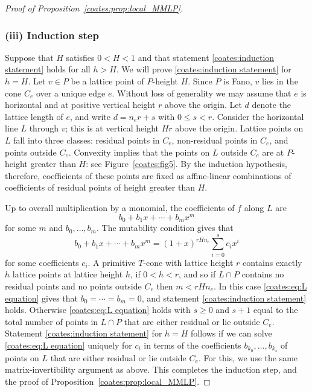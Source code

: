 \begin{proof}[Proof of Proposition~\ref{coates:prop:local_MMLP}]
  \subsubsection*{(iii) Induction step} Suppose that $H$ satisfies $0 < H < 1$ and that statement \eqref{coates:induction statement} holds for all $h > H$. We will prove \eqref{coates:induction statement} for $h=H$. Let $v \in P$ be a lattice point of $P$-height $H$. Since $P$ is Fano, $v$ lies in the cone $C_e$ over a unique edge $e$. Without loss of generality we may assume that $e$ is horizontal and at positive vertical height $r$ above the origin. Let $d$ denote the lattice length of $e$, and write $d = n_e r + s$ with $0 \leq s < r$. Consider the horizontal line $L$ through $v$; this is at vertical height $Hr$ above the origin. Lattice points on $L$ fall into three classes: residual points in $C_e$, non-residual points in $C_e$, and points outside $C_e$. Convexity implies that the points on $L$ outside $C_e$ are at $P$-height greater than $H$: see Figure~\ref{coates:fig5}. By the induction hypothesis, therefore, coefficients of these points are fixed as affine-linear combinations of coefficients of residual points of height greater than $H$. 
  
  Up to overall multiplication by a monomial, the coefficients of $f$ along $L$ are
  \[
    b_0 + b_1 x + \cdots + b_m x^m  
  \]
  for some $m$ and $b_0,\ldots,b_m$. The mutability condition gives that 
  \begin{equation}
    \label{coates:eq:L equation}
    b_0 + b_1 x + \cdots + b_m x^m = 
    (1+x)^{r H n_e } \sum_{i=0}^s c_i x^i
  \end{equation}
  for some coefficients $c_i$. A primitive $T$-cone with lattice height $r$ contains exactly $h$ lattice points at lattice height $h$, if $0 < h < r$, and so if $L \cap P$ contains no residual points and no points outside $C_e$ then $m<r H n_e$. In this case \eqref{coates:eq:L equation} gives that $b_0 = \cdots = b_m = 0$, and statement \eqref{coates:induction statement} holds. Otherwise \eqref{coates:eq:L equation} holds with $s \geq 0$ and $s+1$ equal to the total number of points in $L \cap P$ that are either residual or lie outside $C_e$. Statement \eqref{coates:induction statement} for $h=H$ follows if we can solve \eqref{coates:eq:L equation} uniquely for $c_i$ in terms of the coefficients $b_{k_0}, \ldots, b_{k_s}$ of points on $L$ that are either residual or lie outside $C_e$. For this, we use the same matrix-invertibility argument as above. This completes the induction step, and the proof of Proposition~\ref{coates:prop:local_MMLP}.
\end{proof}
